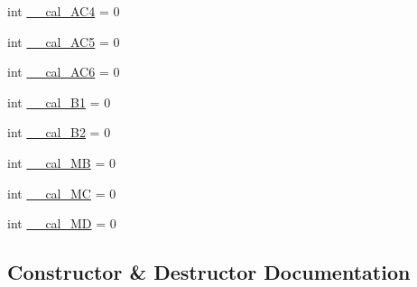 \begin{DoxyCompactItemize}
\item 
int \hyperlink{classlibsensorPy_1_1concretesensor_1_1bmp085Temperature_1_1BMP085Temperature_ae1b50510aa4fead3f534c8afb0c6f2da}{\+\_\+\+\_\+cal\+\_\+\+A\+C4} = 0
\item 
int \hyperlink{classlibsensorPy_1_1concretesensor_1_1bmp085Temperature_1_1BMP085Temperature_a927635de26cebb165d20532982ec96fe}{\+\_\+\+\_\+cal\+\_\+\+A\+C5} = 0
\item 
int \hyperlink{classlibsensorPy_1_1concretesensor_1_1bmp085Temperature_1_1BMP085Temperature_abc39b848c801bd3eef7702b8c18490f0}{\+\_\+\+\_\+cal\+\_\+\+A\+C6} = 0
\item 
int \hyperlink{classlibsensorPy_1_1concretesensor_1_1bmp085Temperature_1_1BMP085Temperature_a3dff1c7d4169f7a65eb10da9d4df1e08}{\+\_\+\+\_\+cal\+\_\+\+B1} = 0
\item 
int \hyperlink{classlibsensorPy_1_1concretesensor_1_1bmp085Temperature_1_1BMP085Temperature_aa600d0024900011cffb598f6131b622c}{\+\_\+\+\_\+cal\+\_\+\+B2} = 0
\item 
int \hyperlink{classlibsensorPy_1_1concretesensor_1_1bmp085Temperature_1_1BMP085Temperature_aca70e9afb9d631639a8a730bf97dab48}{\+\_\+\+\_\+cal\+\_\+\+M\+B} = 0
\item 
int \hyperlink{classlibsensorPy_1_1concretesensor_1_1bmp085Temperature_1_1BMP085Temperature_a63e0f0393e4ccb9fe5be2d9fba5c9353}{\+\_\+\+\_\+cal\+\_\+\+M\+C} = 0
\item 
int \hyperlink{classlibsensorPy_1_1concretesensor_1_1bmp085Temperature_1_1BMP085Temperature_a8e582d96f84db71a9e8b3d4a2bcd7801}{\+\_\+\+\_\+cal\+\_\+\+M\+D} = 0
\end{DoxyCompactItemize}


\subsection{Constructor \& Destructor Documentation}
\hypertarget{classlibsensorPy_1_1concretesensor_1_1bmp085Temperature_1_1BMP085Temperature_ae0fea7c9ad3e4e8b0e170b8c095f5ed8}{}
